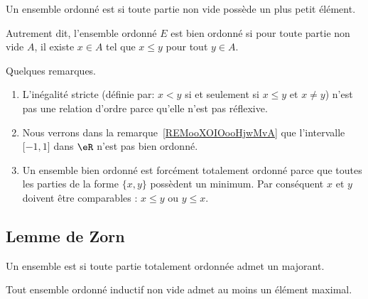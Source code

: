 \begin{definition}   \label{DEFooLJEAooBLGsiS}
	Un ensemble ordonné est  si toute partie non vide possède un plus petit élément.

	Autrement dit, l'ensemble ordonné \( E\) est bien ordonné si pour toute partie non vide \( A\), il existe \( x\in A\) tel que \( x\leq y\) pour tout \( y\in A\).
\end{definition}

\begin{normaltext}  \label{NorooOrdreBienOrdonne}
	Quelques remarques.
	\begin{enumerate}
		\item
		      L'inégalité stricte (définie par: \( x<y\) si et seulement si \( x\leq y\) et \( x\neq y\)) n'est pas une relation d'ordre parce qu'elle n'est pas réflexive.
		\item
		      Nous verrons dans la remarque~\ref{REMooXOIOooHjwMvA}%
		      que l'intervalle \( \mathopen[ -1 , 1 \mathclose]\) dans \( \eR\) n'est pas bien ordonné.
		\item
		      Un ensemble bien ordonné est forcément totalement ordonné parce que toutes les parties de la forme \( \{ x,y \}\) possèdent un minimum. Par conséquent \( x\) et \( y\) doivent être comparables : \( x\leq y\) ou \( y\leq x\).
	\end{enumerate}
\end{normaltext}



\subsection{Lemme de Zorn}
\label{SUBooLemmeZorn}



\begin{definition}  \label{DefGHDfyyz}
	Un ensemble est  si toute partie totalement ordonnée admet un majorant.
\end{definition}


\begin{lemma}    \label{LemUEGjJBc}
	Tout ensemble ordonné inductif non vide admet au moins un élément maximal.
\end{lemma}

